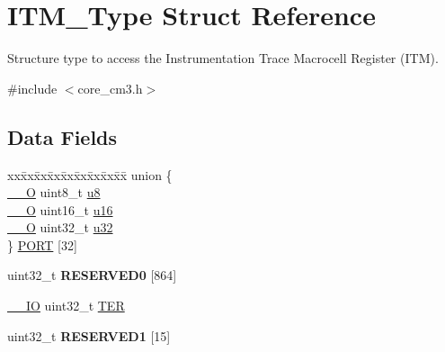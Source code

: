 \hypertarget{struct_i_t_m___type}{\section{I\-T\-M\-\_\-\-Type Struct Reference}
\label{struct_i_t_m___type}
}


Structure type to access the Instrumentation Trace Macrocell Register (I\-T\-M).  




{\ttfamily \#include $<$core\-\_\-cm3.\-h$>$}

\subsection*{Data Fields}
\begin{DoxyCompactItemize}
\item 
\begin{tabbing}
xx\=xx\=xx\=xx\=xx\=xx\=xx\=xx\=xx\=\kill
union \{\\
\>\hyperlink{group___c_m_s_i_s__core__definitions_ga7e25d9380f9ef903923964322e71f2f6}{\_\_O} uint8\_t \hyperlink{struct_i_t_m___type_a0374c0b98ab9de6f71fabff7412df832}{u8}\\
\>\hyperlink{group___c_m_s_i_s__core__definitions_ga7e25d9380f9ef903923964322e71f2f6}{\_\_O} uint16\_t \hyperlink{struct_i_t_m___type_ae8d499140220fa6d4eab1da7262bf08e}{u16}\\
\>\hyperlink{group___c_m_s_i_s__core__definitions_ga7e25d9380f9ef903923964322e71f2f6}{\_\_O} uint32\_t \hyperlink{struct_i_t_m___type_acaf6d0e14a3d4b541c624913b4a1931e}{u32}\\
\} \hyperlink{struct_i_t_m___type_a4dd73c3e23203dc5c6c278c706cb8d8f}{PORT} \mbox{[}32\mbox{]}\\

\end{tabbing}\item 
\hypertarget{struct_i_t_m___type_a63deb05e7a614fd290562e511a2979ff}{uint32\-\_\-t {\bfseries R\-E\-S\-E\-R\-V\-E\-D0} \mbox{[}864\mbox{]}}\label{struct_i_t_m___type_a63deb05e7a614fd290562e511a2979ff}

\item 
\hyperlink{group___c_m_s_i_s__core__definitions_gaec43007d9998a0a0e01faede4133d6be}{\-\_\-\-\_\-\-I\-O} uint32\-\_\-t \hyperlink{struct_i_t_m___type_a8ffb3c6b706b03334f6fe37ef5d8b165}{T\-E\-R}
\item 
\hypertarget{struct_i_t_m___type_a162d8d4bcf80ad9b8f01af570ed81058}{uint32\-\_\-t {\bfseries R\-E\-S\-E\-R\-V\-E\-D1} \mbox{[}15\mbox{]}}\label{struct_i_t_m___type_a162d8d4bcf80ad9b8f01af570ed81058}


\end{DoxyCompactItemize}

